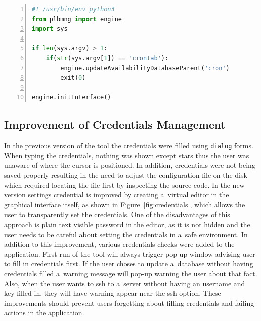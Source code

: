 {{{{{\noindent\begin{minipage}{\linewidth}
\begin{lstlisting}[language=Python, numbers=left, label={lst:plbmngbin}, caption=Source code of the main script populated by PyPI installer into executable folders., frame=single, showstringspaces=false, breaklines=true, keywordstyle=\color{blue},captionpos=b]
#! /usr/bin/env python3
from plbmng import engine
import sys

if len(sys.argv) > 1:
	if(str(sys.argv[1]) == 'crontab'):
		engine.updateAvailabilityDatabaseParent('cron')
		exit(0)

engine.initInterface()
\end{lstlisting}
\end{minipage}}

\subsection{Improvement of Credentials Management}
In the previous version of the tool the credentials were filled using \texttt{dialog} forms. When typing the credentials, nothing was shown except stars thus the user was unaware of where the cursor is positioned. In addition, credentials were not being saved properly resulting in the need to adjust the configuration file on the disk which required locating the file first by inspecting the source code. In the new version settings credential is improved by creating a~virtual editor in the graphical interface itself, as shown in Figure~\ref{fig:credentials}, which allows the user to transparently set the credentials. One of the disadvantages of this approach is plain text visible password in the editor, as it is not hidden and the user needs to be careful about setting the credentials in a~safe environment. In addition to this improvement, various credentials checks were added to the application. First run of the tool will always trigger pop-up window advising user to fill in credentials first. If the user choses to update a~database without having credentials filled a~warning message will pop-up warning the user about that fact. Also, when the user wants to ssh to a~server without having an username and key filled in, they will have warning appear near the ssh option. These improvements should prevent users forgetting about filling credentials and failing actions in the application.

}}}}
